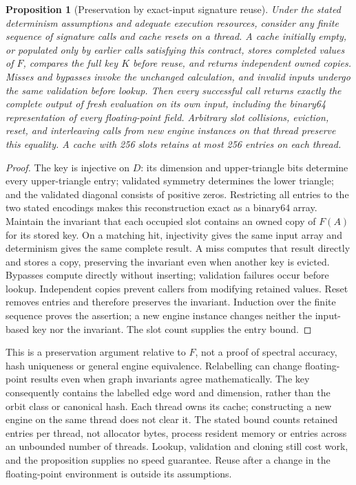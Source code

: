 \documentclass[11pt,a4paper]{article}
\newtheorem{proposition}[theorem]{Proposition}
\theoremstyle{definition}\newtheorem{definition}[theorem]{Definition}
\begin{document}
\begin{proposition}[Preservation by exact-input signature reuse]\label{prop:signaturecache}
Under the stated determinism assumptions and adequate execution resources, consider any finite sequence of signature calls and cache resets on a thread. A cache initially empty, or populated only by earlier calls satisfying this contract, stores completed values of $F$, compares the full key $K$ before reuse, and returns independent owned copies. Misses and bypasses invoke the unchanged calculation, and invalid inputs undergo the same validation before lookup. Then every successful call returns exactly the complete output of fresh evaluation on its own input, including the binary64 representation of every floating-point field. Arbitrary slot collisions, eviction, reset, and interleaving calls from new engine instances on that thread preserve this equality. A cache with 256 slots retains at most 256 entries on each thread.
\end{proposition}
\begin{proof}
The key is injective on $D$: its dimension and upper-triangle bits determine every upper-triangle entry; validated symmetry determines the lower triangle; and the validated diagonal consists of positive zeros. Restricting all entries to the two stated encodings makes this reconstruction exact as a binary64 array. Maintain the invariant that each occupied slot contains an owned copy of $F(A)$ for its stored key. On a matching hit, injectivity gives the same input array and determinism gives the same complete result. A miss computes that result directly and stores a copy, preserving the invariant even when another key is evicted. Bypasses compute directly without inserting; validation failures occur before lookup. Independent copies prevent callers from modifying retained values. Reset removes entries and therefore preserves the invariant. Induction over the finite sequence proves the assertion; a new engine instance changes neither the input-based key nor the invariant. The slot count supplies the entry bound.
\end{proof}

This is a preservation argument relative to $F$, not a proof of spectral accuracy, hash uniqueness or general engine equivalence. Relabelling can change floating-point results even when graph invariants agree mathematically. The key consequently contains the labelled edge word and dimension, rather than the orbit class or canonical hash. Each thread owns its cache; constructing a new engine on the same thread does not clear it. The stated bound counts retained entries per thread, not allocator bytes, process resident memory or entries across an unbounded number of threads. Lookup, validation and cloning still cost work, and the proposition supplies no speed guarantee. Reuse after a change in the floating-point environment is outside its assumptions.
\end{document}
